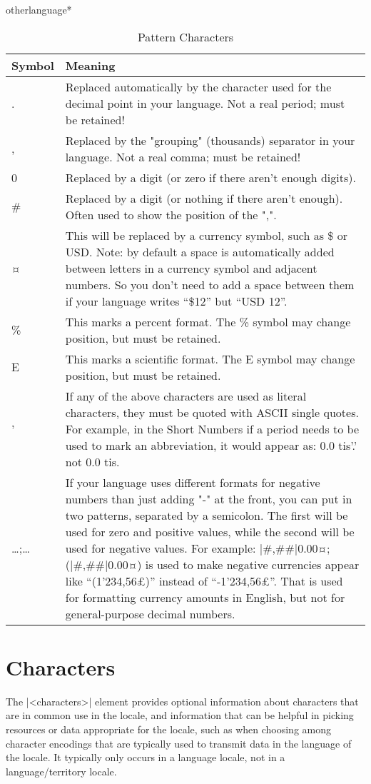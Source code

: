 \begin{docCommandd}{otherlanguage*} { }
\begin{longtable}{lp{11cm}}
\caption{Pattern Characters}\\
\toprule
Symbol & Meaning\\
\midrule
.	&Replaced automatically by the character used for the decimal point in your language. Not a real period; must be retained!\\
,	&Replaced by the "grouping" (thousands) separator in your language. Not a real comma; must be retained!\\
0	&Replaced by a digit (or zero if there aren't enough digits).\\
\#	&Replaced by a digit (or nothing if there aren't enough). Often used to show the position of the ",".\\
¤	&This will be replaced by a currency symbol, such as \$ or USD. Note: by default a space is automatically added between letters in a currency symbol and adjacent numbers. So you don't need to add a space between them if your language writes \enquote{\$12} but \enquote{USD 12}.\\
\%	&This marks a percent format. The \% symbol may change position, but must be retained.\\
E	&This marks a scientific format. The E symbol may change position, but must be retained.\\
'	&If any of the above characters are used as literal characters, they must be quoted with ASCII single quotes. For example, in the Short Numbers if a period needs to be used to mark an abbreviation, it would appear as:
0.0 tis'.'
not
0.0 tis.\\
\ldots;\ldots	&If your language uses different formats for negative numbers than just adding "-" at the front, you can put in two patterns, separated by a semicolon. The first will be used for zero and positive values, while the second will be used for negative values.
For example: |#,##|0.00¤;(|#,##|0.00¤) is used to make negative currencies appear like \enquote{(1'234,56£)} instead of \enquote{-1'234,56£}. That is used for formatting currency amounts in English, but not for general-purpose decimal numbers.\\
\bottomrule
\end{longtable}

\section{Characters}
The |<characters>| element provides optional information about characters that are in common use in the locale, and information that can be helpful in picking resources or data appropriate for the locale, such as when choosing among character encodings that are typically used to transmit data in the language of the locale. It typically only occurs in a language locale, not in a language/territory locale.


\end{docCommandd}
